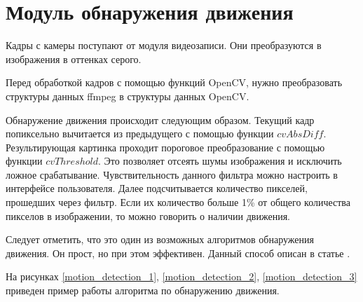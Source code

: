 \section{Модуль обнаружения движения}
Кадры с камеры поступают от модуля видеозаписи.
Они преобразуются в изображения в оттенках серого.

Перед обработкой кадров с помощью функций OpenCV, нужно преобразовать структуры данных ffmpeg
в структуры данных OpenCV.

Обнаружение движения происходит следующим образом.
Текущий кадр попиксельно вычитается из предыдущего с помощью функции $cvAbsDiff$.
Результирующая картинка проходит пороговое преобразование с помощью функции $cvThreshold$.
Это позволяет отсеять шумы изображения и исключить ложное срабатывание.
Чувствительность данного фильтра можно настроить в интерфейсе пользователя.
Далее подсчитывается количество пикселей, прошедших через фильтр.
Если их количество больше 1\% от общего количества пикселов в изображении,
то можно говорить о наличии движения.

Следует отметить, что это один из возможных алгоритмов обнаружения движения.
Он прост, но при этом эффективен. Данный способ описан в статье \cite{motion_detection}.

На рисунках \ref{motion_detection_1}, \ref{motion_detection_2}, \ref{motion_detection_3}
приведен пример работы алгоритма по обнаружению движения.


